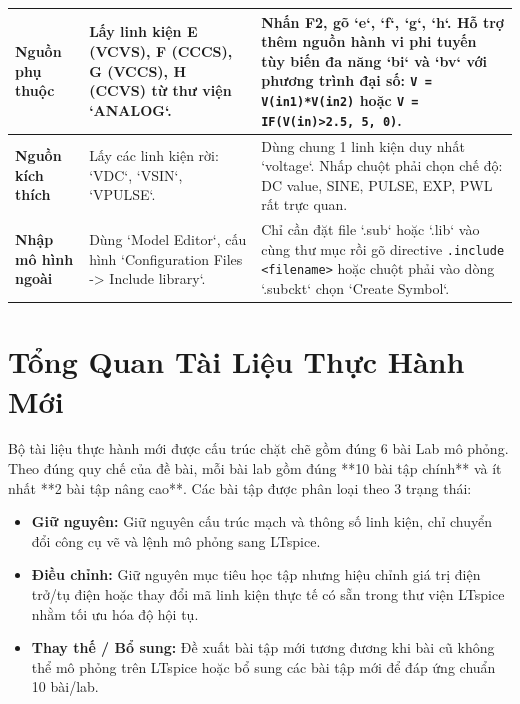 \documentclass[12pt,a4paper]{report}
\begin{document}
\begin{longtable}{|p{3.2cm}|p{6.0cm}|p{6.0cm}|}
\textbf{Nguồn phụ thuộc} & 
Lấy linh kiện E (VCVS), F (CCCS), G (VCCS), H (CCVS) từ thư viện `ANALOG`. & 
Nhấn \textbf{F2}, gõ `e`, `f`, `g`, `h`. Hỗ trợ thêm nguồn hành vi phi tuyến tùy biến đa năng `bi` và `bv` với phương trình đại số: \lstinline|V = V(in1)*V(in2)| hoặc \lstinline|V = IF(V(in)>2.5, 5, 0)|. \\ \hline

\textbf{Nguồn kích thích} & 
Lấy các linh kiện rời: `VDC`, `VSIN`, `VPULSE`. & 
Dùng chung 1 linh kiện duy nhất `voltage`. Nhấp chuột phải chọn chế độ: DC value, SINE, PULSE, EXP, PWL rất trực quan. \\ \hline

\textbf{Nhập mô hình ngoài} & 
Dùng `Model Editor`, cấu hình `Configuration Files -> Include library`. & 
Chỉ cần đặt file `.sub` hoặc `.lib` vào cùng thư mục rồi gõ directive \lstinline|.include <filename>| hoặc chuột phải vào dòng `.subckt` chọn `Create Symbol`. \\ \hline
\end{longtable}

\chapter{Tổng Quan Tài Liệu Thực Hành Mới}

Bộ tài liệu thực hành mới được cấu trúc chặt chẽ gồm đúng 6 bài Lab mô phỏng. Theo đúng quy chế của đề bài, mỗi bài lab gồm đúng **10 bài tập chính** và ít nhất **2 bài tập nâng cao**. Các bài tập được phân loại theo 3 trạng thái:
\begin{itemize}[noitemsep]
    \item \textbf{Giữ nguyên:} Giữ nguyên cấu trúc mạch và thông số linh kiện, chỉ chuyển đổi công cụ vẽ và lệnh mô phỏng sang LTspice.
    \item \textbf{Điều chỉnh:} Giữ nguyên mục tiêu học tập nhưng hiệu chỉnh giá trị điện trở/tụ điện hoặc thay đổi mã linh kiện thực tế có sẵn trong thư viện LTspice nhằm tối ưu hóa độ hội tụ.
    \item \textbf{Thay thế / Bổ sung:} Đề xuất bài tập mới tương đương khi bài cũ không thể mô phỏng trên LTspice hoặc bổ sung các bài tập mới để đáp ứng chuẩn 10 bài/lab.
\end{itemize}
\end{document}
